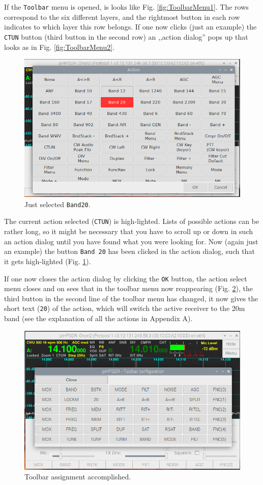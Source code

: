 \documentclass[12pt]{book}
\def\bltt#1{\texttt{\color{blue}#1}}
\begin{document}
If the \bltt{Toolbar} menu is opened, is looks like Fig. \ref{fig:ToolbarMenu1}.
The rows correspond to the six different layers, and the rightmost button in each
row indicates to which layer this row belongs.
 If one now clicks (just an example)
the \texttt{CTUN} button (third button in the second row) an ,,action dialog'' pops up that looks as 
in Fig. \ref{fig:ToolbarMenu2}.


\begin{figure}[ht!]
\center
\includegraphics[width=12cm]{ToolbarMenu3.png}
\caption{Just selected \texttt{Band20}.}
\label{fig:ToolbarMenu3}
\end{figure}

The current action selected (\texttt{CTUN}) is high-lighted. Lists of possible actions can be rather long,
so it might be necessary that you have to scroll up or down in such an action dialog until you have
found what you were looking for. Now (again just an example) the button \texttt{Band 20} has been clicked
in the action dialog, such that it gets high-lighted (Fig. \ref{fig:ToolbarMenu3}).

If one now closes the action dialog by clicking the \texttt{OK} button, the action select menu
closes and on sees that in the toolbar menu now reappearing (Fig. \ref{fig:ToolbarMenu4}), the third button 
in the second
line of the toolbar menu has changed, it now gives the short text (\texttt{20}) of the action, which will
switch the active receiver to the 20m band (see the explanation of all the actions in Appendix A).

\begin{figure}[ht!]
\center
\includegraphics[width=12cm]{ToolbarMenu4.png}
\caption{Toolbar assignment accomplished.}
\label{fig:ToolbarMenu4}
\end{figure}
\end{document}
